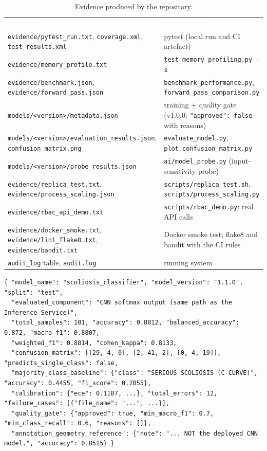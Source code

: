 \documentclass[12pt,a4paper]{article}
\newcommand{\fp}[1]{\nolinkurl{#1}}
\newcommand{\hd}[1]{\textcolor{white}{\textbf{#1}}}
\begin{document}
\begin{table}[H]
\centering
\caption{Evidence produced by the repository.}
\label{tab:evidence}
\renewcommand{\arraystretch}{1.25}
\begin{tabularx}{\textwidth}{L{6.4cm} Y}
\hd{Artefact} & \hd{Produced by} \\
\fp{evidence/pytest_run.txt}, \texttt{coverage.xml}, \texttt{test-results.xml} & pytest (local run and CI artefact) \\
\fp{evidence/memory_profile.txt} & \texttt{test\_memory\_profiling.py -s} \\
\fp{evidence/benchmark.json}, \fp{evidence/forward_pass.json} & \fp{benchmark_performance.py}, \fp{forward_pass_comparison.py} \\
\fp{models/<version>/metadata.json} & training + quality gate (v1.0.0: \texttt{"approved": false} with reasons) \\
\fp{models/<version>/evaluation_results.json}, \fp{confusion_matrix.png} & \texttt{evaluate\_model.py}, \fp{plot_confusion_matrix.py} \\
\fp{models/<version>/probe_results.json} & \fp{ai/model_probe.py} (input-sensitivity probe) \\
\fp{evidence/replica_test.txt}, \fp{evidence/process_scaling.json} & \fp{scripts/replica_test.sh}, \fp{scripts/process_scaling.py} \\
\fp{evidence/rbac_api_demo.txt} & \fp{scripts/rbac_demo.py}: real API calls \\
\fp{evidence/docker_smoke.txt}, \fp{evidence/lint_flake8.txt}, \fp{evidence/bandit.txt} & Docker smoke test; flake8 and bandit with the CI rules \\
\texttt{audit\_log} table, \texttt{audit.log} & running system \\
\end{tabularx}
\end{table}

\begin{lstlisting}[language={}, caption={\texttt{models/scoliosis\_classifier\_v1.1.0/evaluation\_results.json} (values of the file).}]
{ "model_name": "scoliosis_classifier", "model_version": "1.1.0", "split": "test",
  "evaluated_component": "CNN softmax output (same path as the Inference Service)",
  "total_samples": 101, "accuracy": 0.8812, "balanced_accuracy": 0.872, "macro_f1": 0.8807,
  "weighted_f1": 0.8814, "cohen_kappa": 0.8133,
  "confusion_matrix": [[29, 4, 0], [2, 41, 2], [0, 4, 19]], "predicts_single_class": false,
  "majority_class_baseline": {"class": "SERIOUS SCOLIOSIS (C-CURVE)", "accuracy": 0.4455, "f1_score": 0.2055},
  "calibration": {"ece": 0.1187, ...}, "total_errors": 12, "failure_cases": [{"file_name": "...", ...}],
  "quality_gate": {"approved": true, "min_macro_f1": 0.7, "min_class_recall": 0.6, "reasons": []},
  "annotation_geometry_reference": {"note": "... NOT the deployed CNN model.", "accuracy": 0.8515} }
\end{lstlisting}
\end{document}
